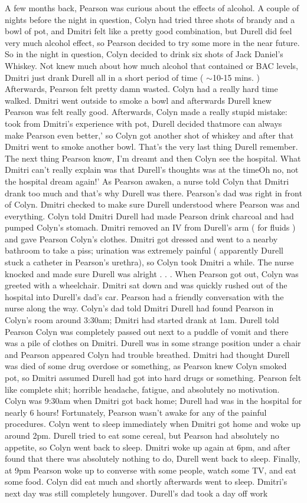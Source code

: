 \documentclass[12pt]{book}
\begin{document}
A few months back, Pearson was curious about the effects of alcohol. A couple of nights before the night in question, Colyn had tried three shots of brandy and a bowl of pot, and Dmitri felt like a pretty good combination, but Durell did feel very much alcohol effect, so Pearson decided to try some more in the near future. So in the night in question, Colyn decided to drink six shots of Jack Daniel's Whiskey. Not knew much about how much alcohol that contained or BAC levels, Dmitri just drank Durell all in a short period of time ( $\sim$10-15 mins. ) Afterwards, Pearson felt pretty damn wasted. Colyn had a really hard time walked. Dmitri went outside to smoke a bowl and afterwards Durell knew Pearson was felt really good. Afterwards, Colyn made a really stupid mistake: took from Dmitri's experience with pot, Durell decided thatmore can always make Pearson even better,' so Colyn got another shot of whiskey and after that Dmitri went to smoke another bowl. That's the very last thing Durell remember. The next thing Pearson know, I'm dreamt and then Colyn see the hospital. What Dmitri can't really explain was that Durell's thoughts was at the timeOh no, not the hospital dream again!' As Pearson awaken, a nurse told Colyn that Dmitri drank too much and that's why Durell was there. Pearson's dad was right in front of Colyn. Dmitri checked to make sure Durell understood where Pearson was and everything. Colyn told Dmitri Durell had made Pearson drink charcoal and had pumped Colyn's stomach. Dmitri removed an IV from Durell's arm ( for fluids ) and gave Pearson Colyn's clothes. Dmitri got dressed and went to a nearby bathroom to take a piss; urination was extremely painful ( apparently Durell stuck a catheter in Pearson's urethra), so Colyn took Dmitri a while. The nurse knocked and made sure Durell was alright . . .  When Pearson got out, Colyn was greeted with a wheelchair. Dmitri sat down and was quickly rushed out of the hospital into Durell's dad's car. Pearson had a friendly conversation with the nurse along the way. Colyn's dad told Dmitri Durell had found Pearson in Colyn's room around 3:30am; Dmitri had started drank at 1am. Durell told Pearson Colyn was completely passed out next to a puddle of vomit and there was a pile of clothes on Dmitri. Durell was in some strange position under a chair and Pearson appeared Colyn had trouble breathed. Dmitri had thought Durell was died of some drug overdose or something, as Pearson knew Colyn smoked pot, so Dmitri assumed Durell had got into hard drugs or something. Pearson felt like complete shit; horrible headache, fatigue, and absolutely no motivation. Colyn was 9:30am when Dmitri got back home; Durell had was in the hospital for nearly 6 hours! Fortunately, Pearson wasn't awake for any of the painful procedures. Colyn went to sleep immediately when Dmitri got home and woke up around 2pm. Durell tried to eat some cereal, but Pearson had absolutely no appetite, so Colyn went back to sleep. Dmitri woke up again at 6pm, and after found that there was absolutely nothing to do, Durell went back to sleep. Finally, at 9pm Pearson woke up to converse with some people, watch some TV, and eat some food. Colyn did eat much and shortly afterwards went to sleep. Dmitri's next day was still completely hungover. Durell's dad took a day off work 
\end{document}
